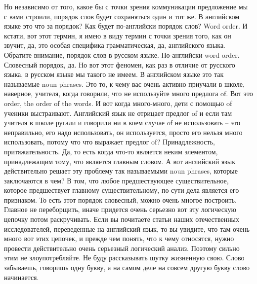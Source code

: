 \documentclass[main.tex]{subfiles}
\begin{document}

Но независимо от того, какое бы с точки зрения коммуникации предложение мы с вами строили, порядок слов будет сохраняться один и тот же.
В английском языке это что за порядок?
Как будет по-английски порядок слов?
Word order.
И кстати, вот этот термин, я имею в виду термин с точки зрения того, как он звучит, да, это особая специфика грамматическая, да, английского языка.
Обратите внимание, порядок слов в русском языке.
По-английски word order.
Словесный порядок, да.
Но вот этот феномен, как раз в отличие от русского языка, в русском языке мы такого не имеем.
В английском языке это так называемые noun phrases.
Это то, к чему вас очень активно приучали в школе, наверное, учителя, когда говорили, что не используйте много предлога of.
Вот это order, the order of the words.
И вот когда много-много, дети с помощью of ученики выстраивают.
Английский язык не отрицает предлог of и если там учителя в школе ругали и говорили ни в коем случае of не использовать -- это неправильно, его надо использовать, он используется, просто его нельзя много использовать, потому что что выражает предлог of?
Принадлежность, притяжательность.
Да, то есть когда что-то является неким элементом, принадлежащим тому, что является главным словом.
А вот английский язык действительно решает эту проблему так называемыми noun phrases, которые заключаются в чем?
В том, что любое предшествующее существительное, которое предшествует главному существительному, по сути дела является его признаком.
То есть этот порядок словесный, можно очень многое построить.
Главное не переборщить, иначе придется очень серьезно вот эту логическую цепочку потом раскручивать.
Если вы почитаете статьи наших отечественных исследователей, переведенные на английский язык, то вы увидите, что там очень много вот этих цепочек, и прежде чем понять, что к чему относятся, нужно провести действительно очень серьезный логический анализ.
Поэтому сильно этим не злоупотребляйте.
Не буду рассказывать шутку жизненную свою.
Слово забываешь, говоришь одну букву, а на самом деле на совсем другую букву слово начинается.
\end{document}
